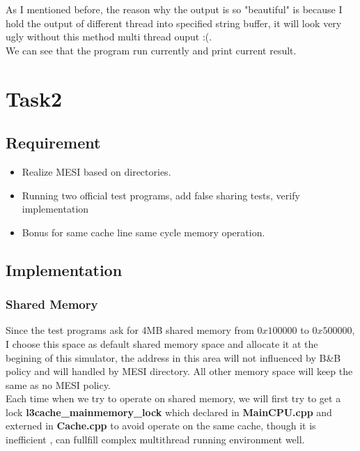 \mathbb{R} \documentclass{article}
\begin{document}
As I mentioned before, the reason why the output is so "beautiful" is because I hold the output of different thread into specified string buffer, it will look very ugly without this method multi thread ouput :(.\\
We can see that the program run currently and print current result.

\section{Task2}
\subsection{Requirement}
\begin{itemize}
  \item Realize MESI based on directories. 
  \item Running two official test programs, add false sharing tests, verify implementation
  \item Bonus for same cache line same cycle memory operation.
\end{itemize} 

\subsection{Implementation}
\subsubsection{Shared Memory}
Since the test programs ask for 4MB shared memory from $0x100000$ to $0x500000$, I choose this space as default shared memory space and allocate it at the begining of this simulator, the address in this area will not influenced by B\&B policy and will handled by MESI directory. All other memory space will keep the same as no MESI policy.\\
Each time when we try to operate on shared memory, we will first try to get a lock \textbf{l3cache\_mainmemory\_lock} which declared in \textbf{MainCPU.cpp} and externed in \textbf{Cache.cpp} to avoid operate on the same cache, though it is inefficient , can fullfill complex multithread running environment well. 
\end{document}

